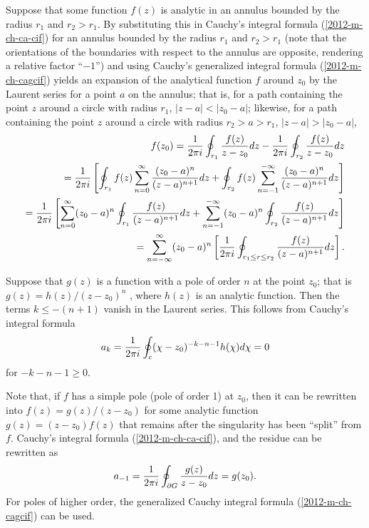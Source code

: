 {Suppose that some function $f(z)$ is analytic in an annulus bounded by the radius $r_1$ and $r_2 > r_1$.
By substituting this in
Cauchy's integral formula
(\ref{2012-m-ch-ca-cif})
for an annulus bounded by the radius $r_1$ and $r_2 > r_1$
(note that the orientations of the boundaries with respect to the annulus are opposite,
rendering a relative factor ``$-1$'')
and using
Cauchy's generalized integral formula
(\ref{2012-m-ch-cagcif})
yields an expansion of the analytical function $f$ around $z_0$ by the Laurent series
for a point $a$ on the annulus; that is,
for a path  containing the point $z$ around a circle with radius
$r_1$, $|z - a| < |z_0 - a|$;
likewise,
for a path  containing the point $z$ around a circle with radius
$r_2 > a > r_1$, $|z - a| > |z_0 - a|$,
\begin{equation}
\begin{split}
f(z_0)=
{1\over 2\pi i}\oint_{r_1}{f(z)\over z-z_0}dz
-
{1\over 2\pi i}\oint_{r_2}{f(z)\over z-z_0}dz
\\
=
{1\over 2\pi i}\left[
\oint_{r_1} f(z) \sum_{n=0}^\infty \frac{ (z_0 - a)^n }{ (z - a)^{n+1}} dz
+
\oint_{r_2} f(z) \sum_{n=-1}^{-\infty} \frac{ (z_0 - a)^n }{ (z - a)^{n+1}} dz
\right]
\\
=
{1\over 2\pi i}\left[
\sum_{n=0}^\infty (z_0 - a)^n  \oint_{r_1}   \frac{  f(z) }{ (z - a)^{n+1}} dz
+
\sum_{n=-1}^{-\infty} (z_0 - a)^n \oint_{r_2} \frac{ f(z) }{ (z - a)^{n+1}} dz
\right]
\\
=
\sum_{n = -\infty}^\infty (z_0 - a)^n  \left[ {1\over 2\pi i} \oint_{r_1\le r \le r_2} \frac{ f(z) }{ (z - a)^{n+1}}  dz \right] .
\end{split}
\label{2012-m-ch-ca-ssolutlarent}
\end{equation}

\eproof
}

Suppose that  $g(z)$ is a function with a pole of order $n$ at the point
 $z_0$; that is
 $g(z)= {h(z)/ (z-z_0)^n}$ ,
where $h(z)$ is an analytic function. Then the terms  $k\le -(n+1)$
vanish in the Laurent series.
This follows from  Cauchy's integral formula
\begin{equation}
a_k ={1\over 2\pi i}\oint_c(\chi -z_0)^{-k-n-1}h(\chi )d\chi =0
\end{equation}
 for $-k-n-1\ge 0$.

Note that, if $f$ has a simple pole (pole of order 1) at $z_0$,
then it can be rewritten into $f(z)=g(z)/(z-z_0)$ for some analytic function $g(z)=(z-z_0) f(z)$
that remains after the singularity has been ``split'' from $f$.
Cauchy's integral formula (\ref{2012-m-ch-ca-cif}),
and the residue can be rewritten as
\begin{equation}
a_{-1}={1\over 2\pi i}
\oint_{\partial G}{g(z)\over z-z_0}dz =
g(z_0)
 .
\label{2012-m-ch-ca-cif1}
\end{equation}
For poles of higher order, the generalized Cauchy integral formula
(\ref{2012-m-ch-cagcif}) can be used.

